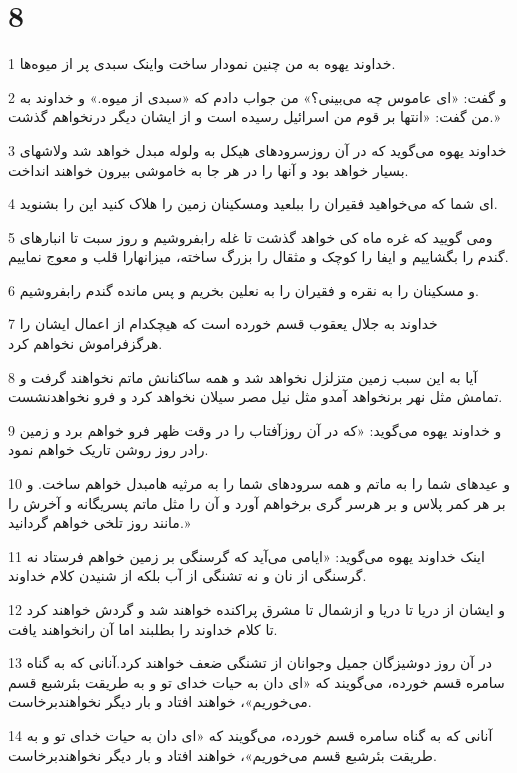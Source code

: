 \chapter{8}

\par 1 خداوند یهوه به من چنین نمودار ساخت واینک سبدی پر از میوه‌ها.
\par 2 و گفت: «ای عاموس چه می‌بینی؟» من جواب دادم که «سبدی از میوه.» و خداوند به من گفت: «انتها بر قوم من اسرائیل رسیده است و از ایشان دیگر درنخواهم گذشت.»
\par 3 خداوند یهوه می‌گوید که در آن روزسرودهای هیکل به ولوله مبدل خواهد شد ولاشهای بسیار خواهد بود و آنها را در هر جا به خاموشی بیرون خواهند انداخت.
\par 4 ‌ای شما که می‌خواهید فقیران را ببلعید ومسکینان زمین را هلاک کنید این را بشنوید.
\par 5 ومی گویید که غره ماه کی خواهد گذشت تا غله رابفروشیم و روز سبت تا انبارهای گندم را بگشاییم و ایفا را کوچک و مثقال را بزرگ ساخته، میزانهارا قلب و معوج نماییم.
\par 6 و مسکینان را به نقره و فقیران را به نعلین بخریم و پس مانده گندم رابفروشیم.
\par 7 خداوند به جلال یعقوب قسم خورده است که هیچکدام از اعمال ایشان را هرگزفراموش نخواهم کرد.
\par 8 آیا به این سبب زمین متزلزل نخواهد شد و همه ساکنانش ماتم نخواهند گرفت و تمامش مثل نهر برنخواهد آمدو مثل نیل مصر سیلان نخواهد کرد و فرو نخواهدنشست.
\par 9 و خداوند یهوه می‌گوید: «که در آن روزآفتاب را در وقت ظهر فرو خواهم برد و زمین رادر روز روشن تاریک خواهم نمود.
\par 10 و عیدهای شما را به ماتم و همه سرودهای شما را به مرثیه هامبدل خواهم ساخت. و بر هر کمر پلاس و بر هرسر گری برخواهم آورد و آن را مثل ماتم پسریگانه و آخرش را مانند روز تلخی خواهم گردانید.»
\par 11 اینک خداوند یهوه می‌گوید: «ایامی می‌آید که گرسنگی بر زمین خواهم فرستاد نه گرسنگی از نان و نه تشنگی از آب بلکه از شنیدن کلام خداوند.
\par 12 و ایشان از دریا تا دریا و ازشمال تا مشرق پراکنده خواهند شد و گردش خواهند کرد تا کلام خداوند را بطلبند اما آن رانخواهند یافت.
\par 13 در آن روز دوشیزگان جمیل وجوانان از تشنگی ضعف خواهند کرد.آنانی که به گناه سامره قسم خورده، می‌گویند که «ای دان به حیات خدای تو و به طریقت بئرشبع قسم می‌خوریم»، خواهند افتاد و بار دیگر نخواهندبرخاست.
\par 14 آنانی که به گناه سامره قسم خورده، می‌گویند که «ای دان به حیات خدای تو و به طریقت بئرشبع قسم می‌خوریم»، خواهند افتاد و بار دیگر نخواهندبرخاست.

